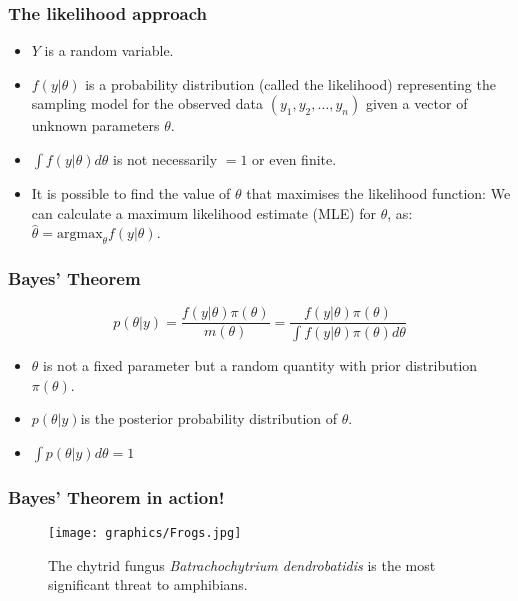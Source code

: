 \documentclass{beamer}
\newcommand{\1}{\ensuremath{\mathbf{1}}}
\begin{document}
%
%
%
\begin{frame}\frametitle{The likelihood approach}
	\begin{block}{}
		\begin{itemize}
			\item $Y$ is a random variable.
			\item $f(y|\theta)$ is a probability distribution (called the likelihood) representing the sampling model for the observed data $(y_1, y_2, \ldots, y_n)$ given a vector of unknown parameters $\theta$.
			\item $\int f (y|\theta)d\theta$ is not necessarily $= 1$ or even finite.
			\item It is possible to find the value of $\theta$ that maximises the likelihood function: We can calculate a maximum likelihood estimate (MLE) for $\theta$, as: $\hat\theta = \text{argmax}_\theta f (y|\theta)$.
		\end{itemize}
	\end{block}
\end{frame}
%
%
%
\begin{frame}\frametitle{Bayes’ Theorem}
	\begin{block}{}
		\begin{equation}
			p(\theta|y) = \frac{f (y|\theta)\pi(\theta)}{m(\theta)} = \frac{f (y|\theta)\pi(\theta)}{\int f (y|\theta)\pi(\theta)d\theta}
		\end{equation}
	\end{block}
	\begin{itemize}
		\item $\theta$ is not a fixed parameter but a random quantity with prior distribution $\pi(\theta)$.
		\item $p(\theta|y) $is the posterior probability distribution of $\theta$.
		\item $\int p(\theta|y) d\theta = 1$
	\end{itemize}
\end{frame}
%
%
%
\begin{frame}\frametitle{Bayes’ Theorem in action!}
	\begin{figure}
	\begin{center}
		\texttt{[image: graphics/Frogs.jpg]}
	\end{center}
	\caption{The chytrid fungus \emph{Batrachochytrium dendrobatidis} is the most significant threat to amphibians.}
	\end{figure}
\end{frame}
\end{document}
